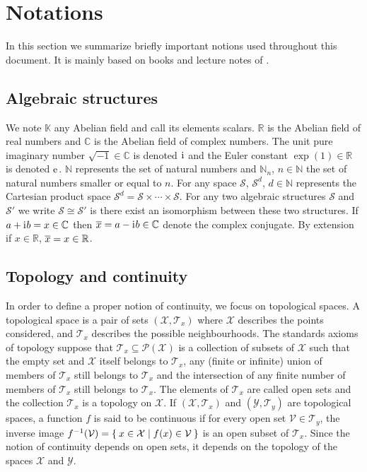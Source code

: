 
\section{Notations}
In this section we summarize briefly important notions used throughout this
document. It is mainly based on books and lecture notes of
\citet{kurdila2006convex,cotaescu2016elements}.

\subsection{Algebraic structures}
\label{sec:notations}
We note $\mathbb{K}$ any Abelian field and call its elements
scalars. $\mathbb{R}$ is the Abelian field of real numbers and $\mathbb{C}$ is
the Abelian field of complex numbers. The unit pure imaginary number
$\sqrt{-1}\in\mathbb{C}$ is denoted ${\mathrm{i}\mkern1mu}$ and the Euler constant
$\exp(1)\in\mathbb{R}$ is denoted $\mathrm{e}\mkern1mu$.  $\mathbb{N}$ represents the set of
natural numbers and $\mathbb{N}_n$, $n\in\mathbb{N}$ the set of natural numbers
smaller or equal to $n$. For any space $\mathcal{S}$, $\mathcal{S}^d$,
$d\in\mathbb{N}$ represents the Cartesian product space $\mathcal{S}^d =
\mathcal{S}\times\cdots\times\mathcal{S}$. For any two algebraic structures
$\mathcal{S}$ and $\mathcal{S}'$ we write $\mathcal{S}\cong\mathcal{S}'$ is
there exist an isomorphism between these two structures. If $a+{\mathrm{i}\mkern1mu} b = x \in
\mathbb{C}$ then $\overline{x}=a-{\mathrm{i}\mkern1mu} b\in\mathbb{C}$ denote the complex conjugate.
By extension if $x\in\mathbb{R}$, $\overline{x}=x\in\mathbb{R}$.

\subsection{Topology and continuity}
In order to define a proper notion of continuity, we focus on topological
spaces. A topological space is a pair of sets $(\mathcal{X},\mathcal{T}_x)$
where $\mathcal{X}$ describes the points considered, and $\mathcal{T}_x$
describes the possible neighbourhoods. The standards axioms of topology suppose
that $\mathcal{T}_x\subseteq{\mathcal{P}(\mathcal{X})}$ is a collection of
subsets of $\mathcal{X}$ such that the empty set and $\mathcal{X}$ itself
belongs to $\mathcal{T}_x$, any (finite or infinite) union of members of
$\mathcal{T}_x$ still belongs to $\mathcal{T}_x$ and the intersection of any
finite number of members of $\mathcal{T}_x$ still belongs to $\mathcal{T}_x$.
The elements of $\mathcal{T}_x$ are called open sets and the collection
$\mathcal{T}_x$ is a topology on $\mathcal{X}$. If
$(\mathcal{X},\mathcal{T}_x)$ and $(\mathcal{Y},\mathcal{T}_y)$ are topological
spaces, a function $f$ is said to be continuous if for every open set
$\mathcal{V}\in \mathcal{T}_y$, the inverse image $f^{-1}(\mathcal{V}) = \Set{
x \in \mathcal{X} | f ( x ) \in \mathcal{V} }$ is an open subset of
$\mathcal{T}_x$. Since the notion of continuity depends on open sets, it
depends on the topology of the spaces $\mathcal{X}$ and $\mathcal{Y}$.
